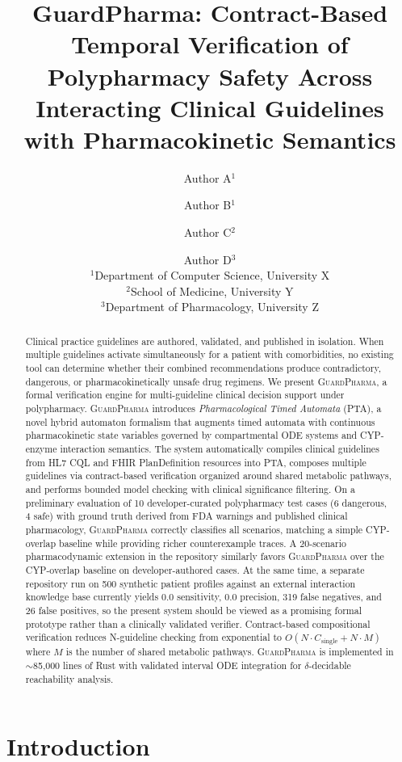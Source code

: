 \documentclass{article}
\title{\textbf{GuardPharma: Contract-Based Temporal Verification of\\Polypharmacy Safety Across Interacting Clinical Guidelines\\with Pharmacokinetic Semantics}}
\author{%
  Author A$^{1}$ \and Author B$^{1}$ \and Author C$^{2}$ \and Author D$^{3}$\\[6pt]
  $^{1}$Department of Computer Science, University X\\
  $^{2}$School of Medicine, University Y\\
  $^{3}$Department of Pharmacology, University Z
}
\date{}
\theoremstyle{definition}
\begin{document}
\maketitle

\begin{abstract}
Clinical practice guidelines are authored, validated, and published in isolation. When multiple guidelines activate simultaneously for a patient with comorbidities, no existing tool can determine whether their combined recommendations produce contradictory, dangerous, or pharmacokinetically unsafe drug regimens. We present \textsc{GuardPharma}, a formal verification engine for multi-guideline clinical decision support under polypharmacy. \textsc{GuardPharma} introduces \emph{Pharmacological Timed Automata} (PTA), a novel hybrid automaton formalism that augments timed automata with continuous pharmacokinetic state variables governed by compartmental ODE systems and CYP-enzyme interaction semantics. The system automatically compiles clinical guidelines from HL7 CQL and FHIR PlanDefinition resources into PTA, composes multiple guidelines via contract-based verification organized around shared metabolic pathways, and performs bounded model checking with clinical significance filtering. On a preliminary evaluation of 10 developer-curated polypharmacy test cases (6 dangerous, 4 safe) with ground truth derived from FDA warnings and published clinical pharmacology, \textsc{GuardPharma} correctly classifies all scenarios, matching a simple CYP-overlap baseline while providing richer counterexample traces. A 20-scenario pharmacodynamic extension in the repository similarly favors \textsc{GuardPharma} over the CYP-overlap baseline on developer-authored cases. At the same time, a separate repository run on 500 synthetic patient profiles against an external interaction knowledge base currently yields 0.0 sensitivity, 0.0 precision, 319 false negatives, and 26 false positives, so the present system should be viewed as a promising formal prototype rather than a clinically validated verifier. Contract-based compositional verification reduces N-guideline checking from exponential to $O(N \cdot C_{\text{single}} + N \cdot M)$ where $M$ is the number of shared metabolic pathways. \textsc{GuardPharma} is implemented in ${\sim}$85{,}000 lines of Rust with validated interval ODE integration for $\delta$-decidable reachability analysis.
\end{abstract}

\section{Introduction}
\label{sec:intro}
\end{document}
